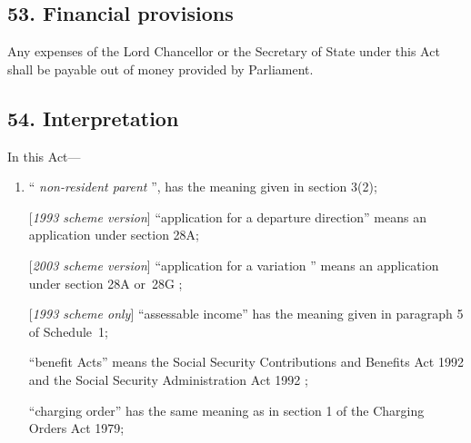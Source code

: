\documentclass[12pt,a4paper]{article}
\begin{document}
\subsection{53. Financial provisions}

Any expenses of the Lord Chancellor or the Secretary of State under this Act shall be payable out of money provided by Parliament.


\subsection{54. Interpretation}

In this Act—
\begin{enumerate}\item[]
    “%
\emph{non-resident parent}%
”, has the meaning given in section 3(2);



[\emph{1993 scheme version}] “application for a departure direction” means an application under section 28A;

[\emph{2003 scheme version}] “application for a 
variation%
” means an application under section 28A
or~28G%
;

[\emph{1993 scheme only}]     “assessable income” has the meaning given in paragraph 5 of Schedule~1;

    “benefit Acts” means the 
Social Security Contributions and Benefits Act 1992 and the Social Security Administration Act 1992%
;

“charging order” has the same meaning as in section 1 of the Charging Orders Act 1979;


\end{enumerate}
\end{document}
